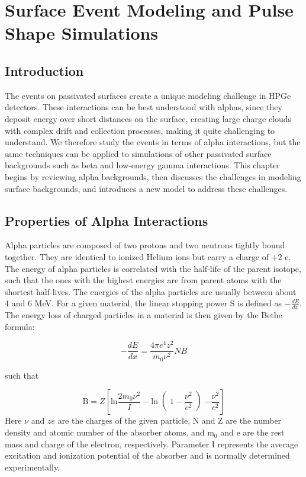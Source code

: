 \chapter{Surface Event Modeling and Pulse Shape Simulations}

\section{Introduction}

The events on passivated surfaces create a unique modeling challenge in HPGe detectors. These interactions can be best understood with alphas, since they deposit energy over short distances on the surface, creating large charge clouds with complex drift and collection processes, making it quite challenging to understand. We therefore study the events in terms of alpha interactions, but the same techniques can be applied to simulations of other passivated surface backgrounds such as beta and low-energy gamma interactions. This chapter begins by reviewing alpha backgrounds, then discusses the challenges in modeling surface backgrounds, and introduces a new model to address these challenges.


\section{Properties of Alpha Interactions}
Alpha particles are composed of two protons and two neutrons tightly bound together. They are identical to ionized Helium ions but carry a charge of $+2$ e. The energy of alpha particles is correlated with the half-life of the parent isotope, such that the ones with the highest energies are from parent atoms with the shortest half-lives. The energies of the alpha particles are usually between about $4$ and $6$ MeV. For a given material, the linear stopping power S is defined as $-\frac{dE}{dx}$. The energy loss of charged particles in a material is then given by the Bethe formula:

\begin{equation}\label{bethe_formula}
    -\frac{dE}{dx} = \frac{4\pi e^4z^2}{m_0\nu^2}NB
\end{equation}

\noindent
such that

\begin{equation}\label{bethe_B}
    \text{B}=Z\left[ \text{ln}\frac{2m_0\nu^2}{I}-\text{ln}\right(1-\frac{\nu^2}{c^2}\left)-\frac{\nu^2}{c^2}\right]
\end{equation}
\noindent
Here $\nu$ and $ze$ are the charges of the given particle, N and Z are the number density and atomic number of the absorber atoms, and m$_0$ and e are the rest mass and charge of the electron, respectively. Parameter I represents the average excitation and ionization potential of the absorber and is normally determined experimentally. 

